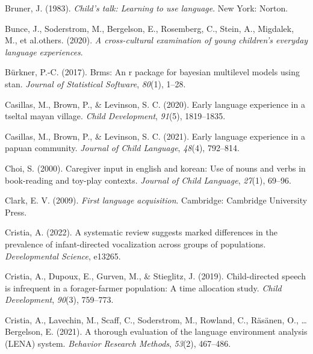 \documentclass[
  man,floatsintext]{apa6}
\newlength{\cslhangindent}
\newlength{\cslentryspacingunit} %
\newenvironment{CSLReferences}[2] %
 {%
  \setlength{\parindent}{0pt}
  \ifodd #1
  \let\oldpar\par
  \def\par{\hangindent=\cslhangindent\oldpar}
  \fi
  \setlength{\parskip}{#2\cslentryspacingunit}
 }%
 {}
\begin{document}
\begin{CSLReferences}{1}{0}
\leavevmode{}%
Bruner, J. (1983). \emph{Child's talk: Learning to use language}. New York: Norton.

\leavevmode{}%
Bunce, J., Soderstrom, M., Bergelson, E., Rosemberg, C., Stein, A., Migdalek, M., et al.others. (2020). \emph{A cross-cultural examination of young children's everyday language experiences}.

\leavevmode{}%
Bürkner, P.-C. (2017). Brms: An r package for bayesian multilevel models using stan. \emph{Journal of Statistical Software}, \emph{80}(1), 1--28.

\leavevmode{}%
Casillas, M., Brown, P., \& Levinson, S. C. (2020). Early language experience in a tseltal mayan village. \emph{Child Development}, \emph{91}(5), 1819--1835.

\leavevmode{}%
Casillas, M., Brown, P., \& Levinson, S. C. (2021). Early language experience in a papuan community. \emph{Journal of Child Language}, \emph{48}(4), 792--814.

\leavevmode{}%
Choi, S. (2000). Caregiver input in english and korean: Use of nouns and verbs in book-reading and toy-play contexts. \emph{Journal of Child Language}, \emph{27}(1), 69--96.

\leavevmode{}%
Clark, E. V. (2009). \emph{First language acquisition}. Cambridge: Cambridge University Press.

\leavevmode{}%
Cristia, A. (2022). A systematic review suggests marked differences in the prevalence of infant-directed vocalization across groups of populations. \emph{Developmental Science}, e13265.

\leavevmode{}%
Cristia, A., Dupoux, E., Gurven, M., \& Stieglitz, J. (2019). Child-directed speech is infrequent in a forager-farmer population: A time allocation study. \emph{Child Development}, \emph{90}(3), 759--773.

\leavevmode{}%
Cristia, A., Lavechin, M., Scaff, C., Soderstrom, M., Rowland, C., Räsänen, O., \ldots{} Bergelson, E. (2021). A thorough evaluation of the language environment analysis (LENA) system. \emph{Behavior Research Methods}, \emph{53}(2), 467--486.


\end{CSLReferences}
\end{document}
